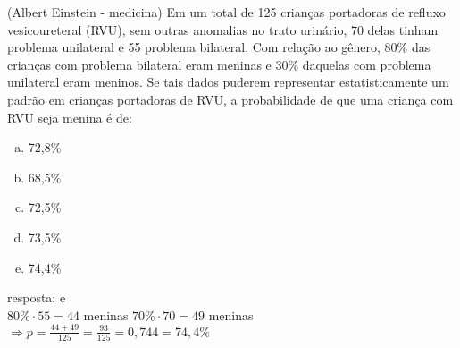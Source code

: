 \begin{ex}
  (Albert Einstein - medicina) Em um total de 125 crianças portadoras de refluxo vesicoureteral (RVU), sem outras anomalias no trato urinário, 70 delas tinham problema unilateral e 55 problema bilateral.
  Com relação ao gênero, 80\% das crianças com problema bilateral eram meninas e 30\% daquelas com problema unilateral eram meninos. Se tais dados puderem representar estatisticamente um padrão em crianças portadoras de RVU, a probabilidade de que uma criança com RVU seja menina é de:
   \begin{enumerate} [(a)]
       \item 72,8\%
       \item 68,5\%
       \item 72,5\%
       \item 73,5\%
       \item 74,4\%
   \end{enumerate}
   \begin{sol}
   resposta: e \\
   $80\% \cdot55 = 44$ meninas \hspace{0,6cm}
   $70\% \cdot70 = 49$ meninas\\
   $\Longrightarrow p =\frac{44+49}{125}=\frac{93}{125}=0,744=74,4\%$
   \end{sol}
 \end{ex}